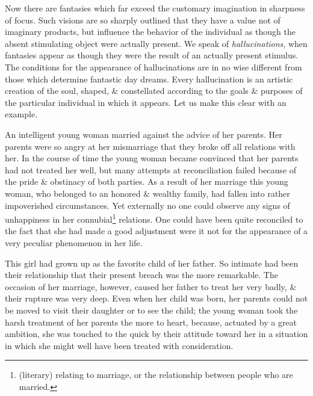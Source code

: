\documentclass{article}
\begin{document}
Now there are fantasies which far exceed the customary imagination in sharpness of focus. Such visions are so sharply outlined that they have a value not of imaginary products, but influence the behavior of the individual as though the absent stimulating object were actually present. We speak of {\it hallucinations}, when fantasies appear as though they were the result of an actually present stimulus. The conditions for the appearance of hallucinations are in no wise different from those which determine fantastic day dreams. Every hallucination is an artistic creation of the soul, shaped, \& constellated according to the goals \& purposes of the particular individual in which it appears. Let us make this clear with an example.

An intelligent young woman married against the advice of her parents. Her parents were so angry at her mismarriage that they broke off all relations with her. In the course of time the young woman became convinced that her parents had not treated her well, but many attempts at reconciliation failed because of the pride \& obstinacy of both parties. As a result of her marriage this young woman, who belonged to an honored \& wealthy family, had fallen into rather impoverished circumstances. Yet externally no one could observe any signs of unhappiness in her connubial\footnote{(literary) relating to marriage, or the relationship between people who are married.} relations. One could have been quite reconciled to the fact that she had made a good adjustment were it not for the appearance of a very peculiar phenomenon in her life.

This girl had grown up as the favorite child of her father. So intimate had been their relationship that their present breach was the more remarkable. The occasion of her marriage, however, caused her father to treat her very badly, \& their rupture was very deep. Even when her child was born, her parents could not be moved to visit their daughter or to see the child; the young woman took the harsh treatment of her parents the more to heart, because, actuated by a great ambition, she was touched to the quick by their attitude toward her in a situation in which she might well have been treated with consideration.
\end{document}
